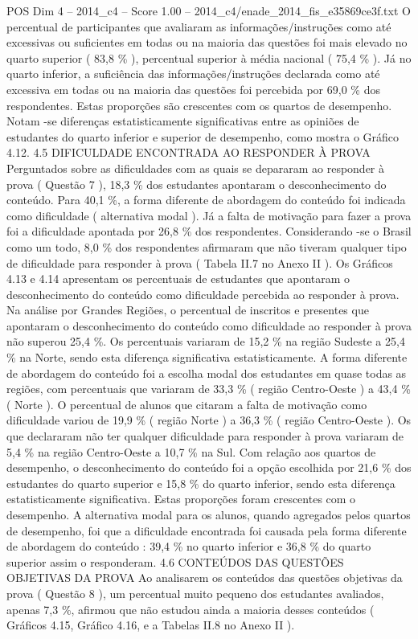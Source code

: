 \begin{textsample}{POS Dim 4 – 2014\_c4 – Score 1.00 – 2014\_c4/enade\_2014\_fis\_e35869ce3f.txt}
O percentual de participantes que avaliaram as informações/instruções como até excessivas ou suficientes em todas ou na maioria das questões foi mais elevado no quarto superior ( 83,8 \% ), percentual superior à média nacional ( 75,4 \% ).
Já no quarto inferior, a suficiência das informações/instruções declarada como até excessiva em todas ou na maioria das questões foi percebida por 69,0 \% dos respondentes.
Estas proporções são crescentes com os quartos de desempenho.
Notam -se diferenças estatisticamente significativas entre as opiniões de estudantes do quarto inferior e superior de desempenho, como mostra o Gráfico 4.12. 4.5 DIFICULDADE ENCONTRADA AO RESPONDER À PROVA Perguntados sobre as dificuldades com as quais se depararam ao responder à prova ( Questão 7 ), 18,3 \% dos estudantes apontaram o desconhecimento do conteúdo.
Para 40,1 \%, a forma diferente de abordagem do conteúdo foi indicada como dificuldade ( alternativa modal ).
Já a falta de motivação para fazer a prova foi a dificuldade apontada por 26,8 \% dos respondentes.
Considerando -se o Brasil como um todo, 8,0 \% dos respondentes afirmaram que não tiveram qualquer tipo de dificuldade para responder à prova ( Tabela II.7 no Anexo II ).
Os Gráficos 4.13 e 4.14 apresentam os percentuais de estudantes que apontaram o desconhecimento do conteúdo como dificuldade percebida ao responder à prova.
Na análise por Grandes Regiões, o percentual de inscritos e presentes que apontaram o desconhecimento do conteúdo como dificuldade ao responder à prova não superou 25,4 \%.
Os percentuais variaram de 15,2 \% na região Sudeste a 25,4 \% na Norte, sendo esta diferença significativa estatisticamente.
A forma diferente de abordagem do conteúdo foi a escolha modal dos estudantes em quase todas as regiões, com percentuais que variaram de 33,3 \% ( região Centro-Oeste ) a 43,4 \% ( Norte ).
O percentual de alunos que citaram a falta de motivação como dificuldade variou de 19,9 \% ( região Norte ) a 36,3 \% ( região Centro-Oeste ).
Os que declararam não ter qualquer dificuldade para responder à prova variaram de 5,4 \% na região Centro-Oeste a 10,7 \% na Sul.
Com relação aos quartos de desempenho, o desconhecimento do conteúdo foi a opção escolhida por 21,6 \% dos estudantes do quarto superior e 15,8 \% do quarto inferior, sendo esta diferença estatisticamente significativa.
Estas proporções foram crescentes com o desempenho.
A alternativa modal para os alunos, quando agregados pelos quartos de desempenho, foi que a dificuldade encontrada foi causada pela forma diferente de abordagem do conteúdo : 39,4 \% no quarto inferior e 36,8 \% do quarto superior assim o responderam. 4.6 CONTEÚDOS DAS QUESTÕES OBJETIVAS DA PROVA Ao analisarem os conteúdos das questões objetivas da prova ( Questão 8 ), um percentual muito pequeno dos estudantes avaliados, apenas 7,3 \%, afirmou que não estudou ainda a maioria desses conteúdos ( Gráficos 4.15, Gráfico 4.16, e a Tabelas II.8 no Anexo II ).

\end{textsample}
